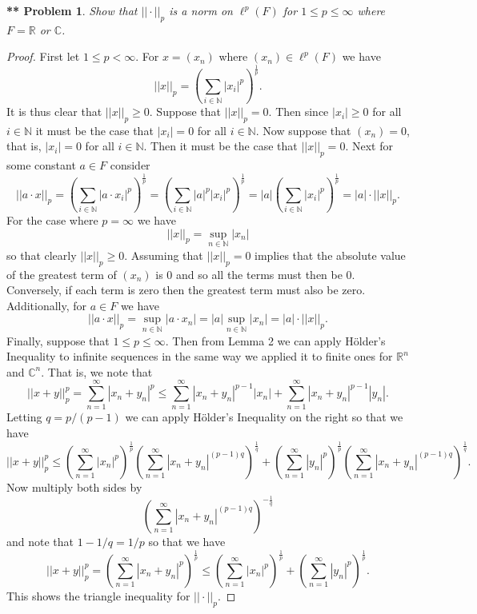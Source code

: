 \documentclass{article}
\newtheorem{**}{** Problem}
\begin{document}
\begin{flushleft}
\begin{**}
Show that $||\cdot||_p$ is a norm on $\ell^p(F)$ for $1 \leq p \leq \infty$ where $F = \mathbb{R}$ or $\mathbb{C}$.
\end{**}
\begin{proof}
First let $1 \leq p < \infty$. For $x = (x_n)$ where $(x_n) \in \ell^p(F)$ we have
\[
||x||_p = \left ( \sum_{i \in \mathbb{N}} |x_i|^p \right )^{\frac{1}{p}}.
\]
It is thus clear that $||x||_p \geq 0$. Suppose that $||x||_p = 0$. Then since $|x_i| \geq 0$ for all $i \in \mathbb{N}$ it must be the case that $|x_i| = 0$ for all $i \in \mathbb{N}$. Now suppose that $(x_n) = 0$, that is, $|x_i| = 0$ for all $i \in \mathbb{N}$. Then it must be the case that $||x||_p = 0$. Next for some constant $a \in F$ consider
\[
||a \cdot x||_p = \left ( \sum_{i \in \mathbb{N}} |a \cdot x_i|^p \right )^{\frac{1}{p}} = \left ( \sum_{i \in \mathbb{N}} |a|^p |x_i|^p \right )^{\frac{1}{p}} = |a| \left ( \sum_{i \in \mathbb{N}} |x_i|^p \right )^{\frac{1}{p}} = |a| \cdot ||x||_p.
\]
For the case where $p = \infty$ we have
\[
||x||_p = \sup_{n \in \mathbb{N}} |x_n|
\]
so that clearly $||x||_p \geq 0$. Assuming that $||x||_p = 0$ implies that the absolute value of the greatest term of $(x_n)$ is $0$ and so all the terms must then be $0$. Conversely, if each term is zero then the greatest term must also be zero. Additionally, for $a \in F$ we have
\[
||a \cdot x||_p = \sup_{n \in \mathbb{N}} |a \cdot x_n| = |a| \sup_{n \in \mathbb{N}} |x_n| = |a| \cdot ||x||_p.
\]
Finally, suppose that $1 \leq p \leq \infty$. Then from Lemma 2 we can apply H\"{o}lder's Inequality to infinite sequences in the same way we applied it to finite ones for $\mathbb{R}^n$ and $\mathbb{C}^n$. That is, we note that
\[
||x+y||_p^p = \sum_{n=1}^{\infty} |x_n + y_n|^p \leq \sum_{n=1}^{\infty} |x_n + y_n|^{p-1} |x_n| + \sum_{n=1}^{\infty} |x_n + y_n|^{p-1} |y_n|.
\]
Letting $q = p/(p-1)$ we can apply H\"{o}lder's Inequality on the right so that we have
\[
||x+y||_p^p \leq \left ( \sum_{n=1}^{\infty} |x_n|^p \right )^{\frac{1}{p}} \left ( \sum_{n=1}^{\infty} |x_n + y_n|^{(p-1)q} \right )^{\frac{1}{q}} + \left ( \sum_{n=1}^{\infty} |y_n|^p \right )^{\frac{1}{p}} \left ( \sum_{n=1}^{\infty} |x_n + y_n|^{(p-1)q} \right )^{\frac{1}{q}}.
\]
Now multiply both sides by
\[
\left ( \sum_{n=1}^{\infty} |x_n + y_n|^{(p-1)q} \right )^{-\frac{1}{q}}
\]
and note that $1 - 1/q = 1/p$ so that we have
\[
||x+y||_p^p = \left ( \sum_{n=1}^{\infty} |x_n + y_n|^p \right )^{\frac{1}{p}} \leq \left ( \sum_{n=1}^{\infty} |x_n|^p \right )^{\frac{1}{p}} + \left ( \sum_{n=1}^{\infty} |y_n|^p \right )^{\frac{1}{p}}.
\]
This shows the triangle inequality for $||\cdot||_p$.
\end{proof}


\end{flushleft}
\end{document}
